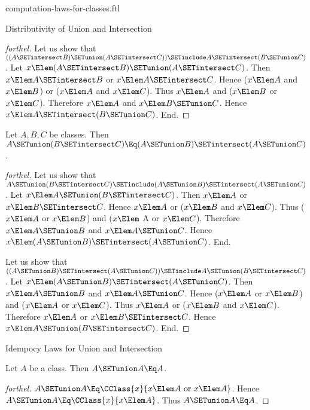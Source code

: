 \documentclass{stex}
\begin{document}
\begin{smodule}{computation-laws-for-classes.ftl}
\begin{sfragment}{Distributivity of Union and Intersection}
\begin{proof}[forthel]
    Let us show that $((A \SETintersect B) \SETunion (A \SETintersect C)) \SETinclude A \SETintersect (B \SETunion C)$. %
      Let $x \Elem (A \SETintersect B) \SETunion (A \SETintersect C)$.
      Then $x \Elem A \SETintersect B$ or $x \Elem A \SETintersect C$.
      Hence ($x \Elem A$ and $x \Elem B$) or ($x \Elem A$ and $x \Elem C$).
      Thus $x \Elem A$ and ($x \Elem B$ or $x \Elem C$).
      Therefore $x \Elem A$ and $x \Elem B \SETunion C$.
      Hence$ x \Elem A \SETintersect (B \SETunion C)$.
    End.
  \end{proof}

  \begin{proposition}[forthel]
    Let $A, B, C$ be classes.
    Then $A \SETunion (B \SETintersect C) \Eq (A \SETunion B) \SETintersect (A \SETunion C)$.
  \end{proposition}
  \begin{proof}[forthel]
    Let us show that $A \SETunion (B \SETintersect C) \SETinclude (A \SETunion B) \SETintersect (A \SETunion C)$.
      Let $x \Elem A \SETunion (B \SETintersect C)$.
      Then $x \Elem A$ or $x \Elem B \SETintersect C$.
      Hence $x \Elem A$ or ($x \Elem B$ and $x \Elem C$).
      Thus ($x \Elem A$ or $x \Elem B$) and ($x \Elem$ A or $x \Elem C$).
      Therefore $x \Elem A \SETunion B$ and $x \Elem A \SETunion C$.
      Hence $x \Elem (A \SETunion B) \SETintersect (A \SETunion C)$.
    End.

    Let us show that $((A \SETunion B) \SETintersect (A \SETunion C)) \SETinclude A \SETunion (B \SETintersect C)$. %
      Let $x \Elem (A \SETunion B) \SETintersect (A \SETunion C)$.
      Then $x \Elem A \SETunion B$ and $x \Elem A \SETunion C$.
      Hence ($x \Elem A$ or $x \Elem B$) and ($x \Elem A$ or $x \Elem C$).
      Thus $x \Elem A$ or ($x \Elem B$ and $x \Elem C$).
      Therefore $x \Elem A$ or $x \Elem B \SETintersect C$.
      Hence $x \Elem A \SETunion (B \SETintersect C)$.
    End.
  \end{proof}
\end{sfragment}

\begin{sfragment}{Idempocy Laws for Union and Intersection}
  \begin{proposition}[forthel]
    Let $A$ be a class.
    Then $A \SETunion A \Eq A$.
  \end{proposition}
  \begin{proof}[forthel]
    $A \SETunion A \Eq \CClass{x}{x \Elem A\text{ or }x \Elem A}$.
    Hence $A \SETunion A \Eq \CClass{x}{x \Elem A}$.
    Thus $A \SETunion A \Eq A$.
  \end{proof}


\end{sfragment}
\end{smodule}
\end{document}
